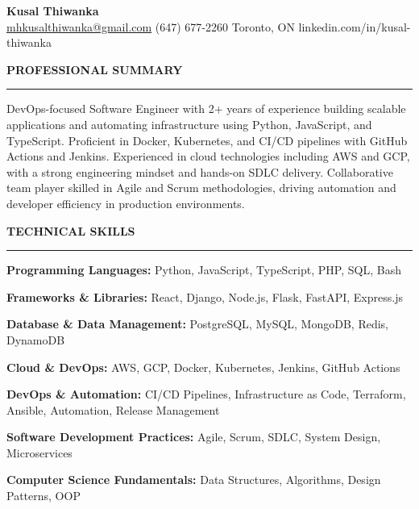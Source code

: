 \documentclass[10pt,letterpaper]{article}
\begin{document}
\begin{center}
{\LARGE\textbf{Kusal Thiwanka}}\\[3pt]
\href{mailto:mhkusalthiwanka@gmail.com}{mhkusalthiwanka@gmail.com}\hspace{2em}%
(647) 677{-}2260\hspace{2em}%
Toronto, ON\hspace{2em}
linkedin.com/in/kusal-thiwanka
\end{center}

\vspace{6pt}

\textbf{PROFESSIONAL SUMMARY}\\[-8pt]
\noindent\rule{\textwidth}{1pt}

\vspace{-2pt}

DevOps-focused Software Engineer with 2+ years of experience building scalable applications and automating infrastructure using Python, JavaScript, and TypeScript. Proficient in Docker, Kubernetes, and CI/CD pipelines with GitHub Actions and Jenkins. Experienced in cloud technologies including AWS and GCP, with a strong engineering mindset and hands-on SDLC delivery. Collaborative team player skilled in Agile and Scrum methodologies, driving automation and developer efficiency in production environments.

\vspace{8pt}

\textbf{TECHNICAL SKILLS}\\[-8pt]
\noindent\rule{\textwidth}{1pt}

\vspace{-2pt}

\textbf{Programming Languages:} Python, JavaScript, TypeScript, PHP, SQL, Bash

\textbf{Frameworks \& Libraries:} React, Django, Node.js, Flask, FastAPI, Express.js

\textbf{Database \& Data Management:} PostgreSQL, MySQL, MongoDB, Redis, DynamoDB

\textbf{Cloud \& DevOps:} AWS, GCP, Docker, Kubernetes, Jenkins, GitHub Actions

\textbf{DevOps \& Automation:} CI/CD Pipelines, Infrastructure as Code, Terraform, Ansible, Automation, Release Management

\textbf{Software Development Practices:} Agile, Scrum, SDLC, System Design, Microservices

\textbf{Computer Science Fundamentals:} Data Structures, Algorithms, Design Patterns, OOP
\end{document}
